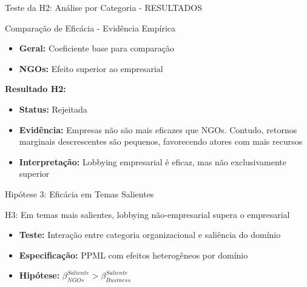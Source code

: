 \documentclass[aspectratio=169]{beamer}
\begin{document}
\begin{frame}{Teste da H2: Análise por Categoria - RESULTADOS}
\begin{block}{Comparação de Eficácia - Evidência Empírica}
\begin{itemize}
\item \textbf{Geral:} Coeficiente base para comparação
\item \textbf{NGOs:} Efeito superior ao empresarial
\end{itemize}
\end{block}

\vspace{0.3cm}

\textbf{Resultado H2:} 
\begin{itemize}
\item \textbf{Status:} Rejeitada
\item \textbf{Evidência:} Empresas não são mais eficazes que NGOs. Contudo, retornos marginais descrescentes são pequenos, favorecendo atores com mais recursos
\item \textbf{Interpretação:} Lobbying empresarial é eficaz, mas não exclusivamente superior
\end{itemize}
\end{frame}

\begin{frame}{Hipótese 3: Eficácia em Temas Salientes}
\begin{block}{H3: Em temas mais salientes, lobbying não-empresarial supera o empresarial}
\begin{itemize}
\item \textbf{Teste:} Interação entre categoria organizacional e saliência do domínio
\item \textbf{Especificação:} PPML com efeitos heterogêneos por domínio
\item \textbf{Hipótese:} $\beta_{NGOs}^{Saliente} > \beta_{Business}^{Saliente}$
\end{itemize}
\end{block}
\end{frame}
\end{document}
